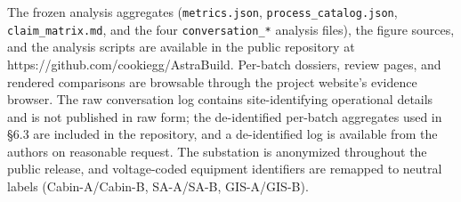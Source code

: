 \documentclass[10pt,a4paper]{article}
\begin{document}
The frozen analysis aggregates (\texttt{metrics.json},
\texttt{process\_catalog.json}, \texttt{claim\_matrix.md}, and the four
\texttt{conversation\_*} analysis files), the figure sources, and the
analysis scripts are available in the public repository at
https://github.com/cookiegg/AstraBuild. Per-batch dossiers, review
pages, and rendered comparisons are browsable through the project
website's evidence browser. The raw conversation log contains
site-identifying operational details and is not published in raw form;
the de-identified per-batch aggregates used in §6.3 are included in the
repository, and a de-identified log is available from the authors on
reasonable request. The substation is anonymized throughout the public
release, and voltage-coded equipment identifiers are remapped to neutral
labels (Cabin-A/Cabin-B, SA-A/SA-B, GIS-A/GIS-B).
\balance
\small


\end{document}
